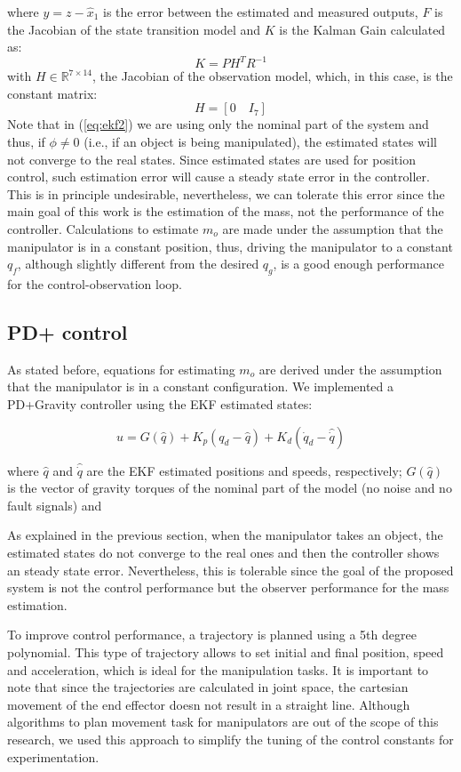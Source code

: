 \documentclass[conference,letterpaper]{ieeeconf}
\begin{document}
where $y=z - \hat{x}_1$ is the error between the estimated and measured outputs, $F$ is the Jacobian of the state transition model and $K$ is the Kalman Gain calculated as:
\[
K = PH^TR^{-1}
\]
with $H\in\mathbb{R}^{7\times 14}$, the Jacobian of the observation model, which, in this case, is the constant matrix:
\[
H = \left[0\quad I_7\right]
\]
Note that in (\ref{eq:ekf2}) we are using only the nominal part of the system and thus, if $\phi\neq 0$ (i.e., if an object is being manipulated), the estimated states will not converge to the real states. Since estimated states are used for position control, such estimation error will cause a steady state error in the controller. This is in principle undesirable, nevertheless, we can tolerate this error since the main goal of this work is the estimation of the mass, not the performance of the controller. Calculations to estimate $m_o$ are made under the assumption that the manipulator is in a constant position, thus, driving the manipulator to a constant $q_f$, although slightly different from the desired $q_g$, is a good enough performance for the control-observation loop.

\subsection{PD+ control}
As stated before, equations for estimating $m_o$ are derived under the assumption that the manipulator is in a constant configuration. We implemented a PD+Gravity controller using the EKF estimated states:

\begin{equation}
  u = G(\hat{q}) + K_p(q_d - \hat{q}) + K_d(\dot{q}_d - \hat{\dot{q}})
\end{equation}

where $\hat{q}$ and $\hat{\dot{q}}$ are the EKF estimated positions and speeds, respectively; $G(\hat{q})$ is the vector of gravity torques of the nominal part of the model (no noise and no fault signals) and 

As explained in the previous section, when the manipulator takes an object, the estimated states do not converge to the real ones and then the controller shows an steady state error. Nevertheless, this is tolerable since the goal of the proposed system is not the control performance but the observer performance for the mass estimation.

To improve control performance, a trajectory is planned using a 5th degree polynomial. This type of trajectory allows to set initial and final position, speed and acceleration, which is ideal for the manipulation tasks. It is important to note that since the trajectories are calculated in joint space, the cartesian movement of the end effector doesn not result in a straight line. Although algorithms to plan movement task for manipulators are out of the scope of this research, we used this approach to simplify the tuning of the control constants for experimentation.
\end{document}
